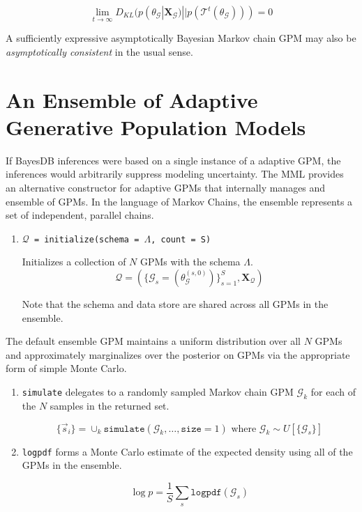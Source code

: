 \documentclass[10pt,letterpaper]{article}
\newcommand{\set}[1]{\{#1\}}
\begin{document}
\begin{equation*}
\lim_{t\to\infty}D_{KL}(p(\theta_\mathcal{G}|\mathbf{X_\mathcal{G}}) ||
p(\mathcal{T}^t(\theta_\mathcal{G}))) = 0
\end{equation*}

A sufficiently expressive asymptotically Bayesian Markov chain GPM may also be
\textit{asymptotically consistent} in the usual sense.

\section{An Ensemble of Adaptive Generative Population Models}
\label{sec:ensemble}

If BayesDB inferences were based on a single instance of a adaptive GPM, the
inferences would arbitrarily suppress modeling uncertainty. The MML provides an
alternative constructor for adaptive GPMs that internally manages and ensemble
of GPMs. In the language of Markov Chains, the ensemble represents a set of
independent, parallel chains.

\begin{enumerate}
\item \texttt{$\mathcal{Q}$ = initialize(schema = $\Lambda$, count = S)}

    Initializes a collection of $N$ GPMs with the schema $\Lambda$.
    $$
    \mathcal{Q} =
    (\set{\mathcal{G}_s = (\theta_{\mathcal{G}}^{(s,0)})}_{s=1}^S,
    \mathbf{X_\mathcal{Q}})
    $$

    Note that the schema and data store are shared across all GPMs in the
    ensemble.
\end{enumerate}

The default ensemble GPM maintains a uniform distribution over all $N$ GPMs and
approximately marginalizes over the posterior on GPMs via the appropriate form
of simple Monte Carlo.

\begin{enumerate}
\item \texttt{simulate} delegates to a randomly sampled Markov chain GPM
$\mathcal{G}_k$ for each of the $N$ samples in the returned set.

    $$
    \set{\vec{s}_i} = \cup_k \texttt{simulate}
    (\mathcal{G}_k,\dots,\texttt{size} = 1) \text{ where }
    \mathcal{G}_k \sim U[\set{\mathcal{G}_s}]
    $$

\item \texttt{logpdf} forms a Monte Carlo estimate of the expected density using
all of the GPMs in the ensemble.

    $$
    \log p = \frac{1}{S}\sum_s\texttt{logpdf}(\mathcal{G}_s)
    $$
\end{enumerate}
\end{document}
